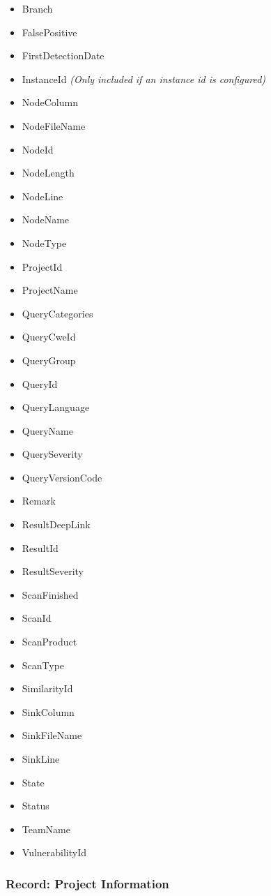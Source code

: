 \begin{itemize}
    \item Branch
    \item FalsePositive
    \item FirstDetectionDate
    \item InstanceId \textit{(Only included if an instance id is configured)}
    \item NodeColumn
    \item NodeFileName
    \item NodeId
    \item NodeLength
    \item NodeLine
    \item NodeName
    \item NodeType
    \item ProjectId
    \item ProjectName
    \item QueryCategories
    \item QueryCweId
    \item QueryGroup
    \item QueryId
    \item QueryLanguage
    \item QueryName
    \item QuerySeverity
    \item QueryVersionCode
    \item Remark
    \item ResultDeepLink
    \item ResultId
    \item ResultSeverity
    \item ScanFinished
    \item ScanId
    \item ScanProduct
    \item ScanType
    \item SimilarityId
    \item SinkColumn
    \item SinkFileName
    \item SinkLine
    \item State
    \item Status
    \item TeamName
    \item VulnerabilityId
\end{itemize}


\subsubsection{Record: Project Information}

